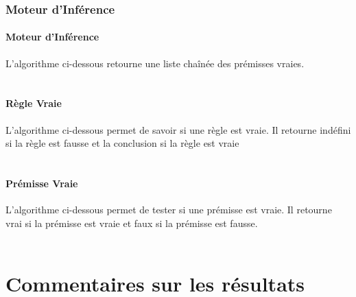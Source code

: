\documentclass[12pt]{article}
\begin{document}
\newpage

\section{Moteur d'Inférence}

\subsection{Moteur d'Inférence}
L'algorithme ci-dessous retourne une liste chaînée des prémisses vraies.\\
\\
\subsection{Règle Vraie}
L'algorithme ci-dessous permet de savoir si une règle est vraie. Il retourne indéfini si la règle est fausse et la conclusion si la règle est vraie\\
\\
\subsection{Prémisse Vraie}
L'algorithme ci-dessous permet de tester si une prémisse est vraie. Il retourne vrai si la prémisse est vraie et faux si la prémisse est fausse.\\
\\
\newpage

\part{Commentaires sur les résultats}

\newpage
\end{document}
